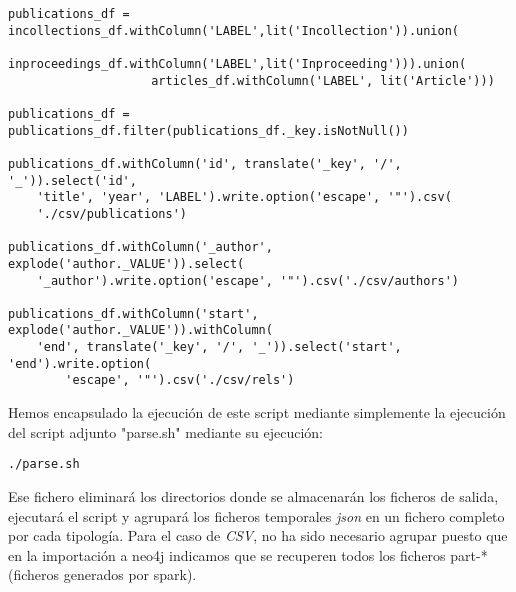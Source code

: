 \begin{verbatim}
publications_df =   incollections_df.withColumn('LABEL',lit('Incollection')).union(
                    inproceedings_df.withColumn('LABEL',lit('Inproceeding'))).union(
                    articles_df.withColumn('LABEL', lit('Article')))

publications_df = publications_df.filter(publications_df._key.isNotNull())

publications_df.withColumn('id', translate('_key', '/', '_')).select('id',
    'title', 'year', 'LABEL').write.option('escape', '"').csv(
    './csv/publications')

publications_df.withColumn('_author', explode('author._VALUE')).select(
    '_author').write.option('escape', '"').csv('./csv/authors')

publications_df.withColumn('start', explode('author._VALUE')).withColumn(
    'end', translate('_key', '/', '_')).select('start', 'end').write.option(
        'escape', '"').csv('./csv/rels')
\end{verbatim}


Hemos encapsulado la ejecución de este script mediante simplemente la ejecución del script adjunto "parse.sh" mediante su ejecución:

\begin{verbatim}
./parse.sh
\end{verbatim}

Ese fichero eliminará los directorios donde se almacenarán los ficheros de salida, ejecutará el script y agrupará los ficheros temporales \textit{json} en un fichero completo por cada tipología. Para el caso de \textit{CSV}, no ha sido necesario agrupar puesto que en la importación a neo4j indicamos que se recuperen todos los ficheros part-* (ficheros generados por spark).
